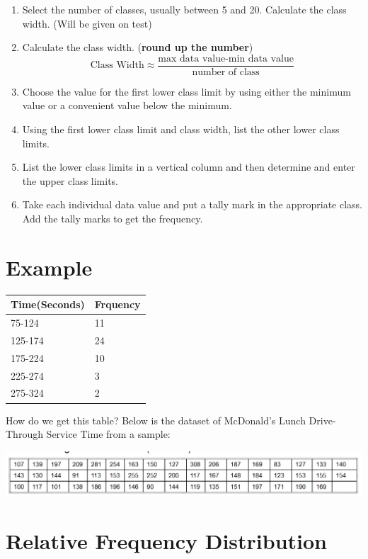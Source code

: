 \documentclass[]{book}
\providecommand{\tightlist}{%
  \setlength{\itemsep}{0pt}\setlength{\parskip}{0pt}}
\begin{document}
\begin{enumerate}
\def\labelenumi{\arabic{enumi}.}
\tightlist
\item
  Select the number of classes, usually between 5 and 20. Calculate the class width. (Will be given on test)
\item
  Calculate the class width. (\textbf{round up the number})
  \[\textrm{Class Width}\approx\frac{\textrm{max data value-min data value}}{\textrm{number of class}}\]
\item
  Choose the value for the first lower class limit by using either the minimum value or a convenient value below the minimum.
\item
  Using the first lower class limit and class width, list the other lower class limits.
\item
  List the lower class limits in a vertical column and then determine and enter the upper class limits.
\item
  Take each individual data value and put a tally mark in the appropriate class. Add the tally marks to get the frequency.
\end{enumerate}

\hypertarget{example}{%
\section{Example}\label{example}}

\begin{longtable}[]{@{}ll@{}}
\toprule
Time(Seconds) & Frquency\tabularnewline
\midrule
\endhead
75-124 & 11\tabularnewline
125-174 & 24\tabularnewline
175-224 & 10\tabularnewline
225-274 & 3\tabularnewline
275-324 & 2\tabularnewline
\bottomrule
\end{longtable}

How do we get this table? Below is the dataset of McDonald's Lunch Drive-Through Service Time from a sample:

\includegraphics{Mcdonalds.png}

\hypertarget{relative-frequency-distribution}{%
\section{Relative Frequency Distribution}\label{relative-frequency-distribution}}
\end{document}
